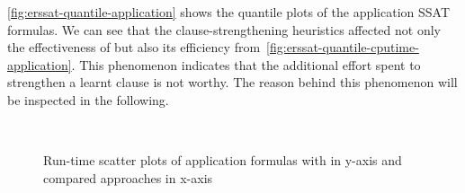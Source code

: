 \cref{fig:erssat-quantile-application} shows the quantile plots of the application SSAT formulas.
We can see that the clause-strengthening heuristics affected not only the effectiveness of \erssat but also its efficiency
from~\cref{fig:erssat-quantile-cputime-application}.
This phenomenon indicates that the additional effort spent to strengthen a learnt clause is not worthy.
The reason behind this phenomenon will be inspected in the following.

\begin{figure}[hp]
    \centering
    \\
    \caption{Run-time scatter plots of application formulas with \erssat in y-axis and compared approaches in x-axis}
    \label{fig:erssat-scatter-application}
\end{figure}

